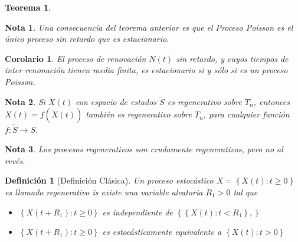 \documentclass{article}
\newtheorem{Def}{Definición}[section]
\newtheorem{Teo}{Teorema}[section]
\newtheorem{Note}{Nota}[section]
\newtheorem{Coro}{Corolario}[section]
\numberwithin{equation}{section}
\begin{document}
{\begin{Teo}
\end{Teo}

\begin{Note}
Una consecuencia del teorema anterior es que el Proceso Poisson es el \'unico proceso sin retardo que es estacionario.
\end{Note}

\begin{Coro}
El proceso de renovaci\'on $N\left(t\right)$ sin retardo, y cuyos tiempos de inter renonaci\'on tienen media finita, es estacionario si y s\'olo si es un proceso Poisson.

\end{Coro}





\begin{Note}
Si $\tilde{X}\left(t\right)$ con espacio de estados $\tilde{S}$ es regenerativo sobre $T_{n}$, entonces $X\left(t\right)=f\left(\tilde{X}\left(t\right)\right)$ tambi\'en es regenerativo sobre $T_{n}$, para cualquier funci\'on $f:\tilde{S}\rightarrow S$.
\end{Note}

\begin{Note}
Los procesos regenerativos son crudamente regenerativos, pero no al rev\'es.
\end{Note}
\begin{Def}[Definici\'on Cl\'asica]
Un proceso estoc\'astico $X=\left\{X\left(t\right):t\geq0\right\}$ es llamado regenerativo is existe una variable aleatoria $R_{1}>0$ tal que
\begin{itemize}
\item[i)] $\left\{X\left(t+R_{1}\right):t\geq0\right\}$ es independiente de $\left\{\left\{X\left(t\right):t<R_{1}\right\},\right\}$
\item[ii)] $\left\{X\left(t+R_{1}\right):t\geq0\right\}$ es estoc\'asticamente equivalente a $\left\{X\left(t\right):t>0\right\}$
\end{itemize}


\end{Def}}
\end{document}
